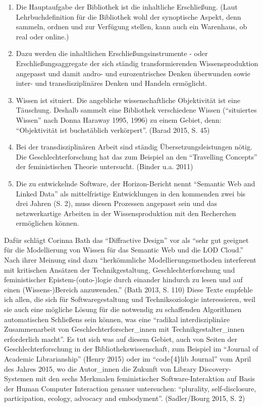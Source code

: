 \begin{enumerate}
\def\labelenumi{\arabic{enumi}.}
\item
  Die Hauptaufgabe der Bibliothek ist die inhaltliche Erschließung.
  (Laut Lehrbuchdefinition für die Bibliothek wohl der synoptische
  Aspekt, denn sammeln, ordnen und zur Verfügung stellen, kann auch ein
  Warenhaus, ob real oder online.)
\item
  Dazu werden die inhaltlichen Erschließungsinstrumente - oder
  Erschließungsaggregate der sich ständig transformierenden
  Wissensproduktion angepasst und damit andro- und eurozentrisches
  Denken überwunden sowie inter- und transdisziplinäres Denken und
  Handeln ermöglicht.
\item
  Wissen ist situiert. Die angebliche wissenschaftliche Objektivität ist
  eine Täuschung. Deshalb sammelt eine Bibliothek verschiedene Wissen
  (\enquote{situiertes Wissen} nach Donna Haraway 1995, 1996) zu einem
  Gebiet, denn: \enquote{Objektivität ist buchstäblich verkörpert}.
  (Barad 2015, S. 45)
\item
  Bei der transdisziplinären Arbeit sind ständig Übersetzungsleistungen
  nötig. Die Geschlechterforschung hat das zum Beispiel an den
  \enquote{Travelling Concepts} der feministischen Theorie untersucht.
  (Binder u.a. 2011)
\item
  Die zu entwickelnde Software, der Horizon-Bericht nennt
  \enquote{Semantic Web and Linked Data} als mittelfristige
  Entwicklungen in den kommenden zwei bis drei Jahren (S. 2), muss
  diesen Prozessen angepasst sein und das netzwerkartige Arbeiten in der
  Wissensproduktion mit den Recherchen ermöglichen können.
\end{enumerate}

Dafür schlägt Corinna Bath das \enquote{Diffractive Design} vor als
\enquote{sehr gut geeignet für die Modellierung von Wissen für das
Semantic Web und die LOD Cloud.} Nach ihrer Meinung sind dazu
\enquote{herkömmliche Modellierungsmethoden interferent mit kritischen
Ansätzen der Technikgestaltung, Geschlechterforschung und feministischer
Epistem-(onto-)logie durch einander hindurch zu lesen und auf einen
(Wissens-)Bereich anzuwenden.} (Bath 2013, S. 110) Diese Texte empfehle
ich allen, die sich für Softwaregestaltung und Techniksoziologie
interessieren, weil sie auch eine mögliche Lösung für die notwendig zu
schaffenden Algorithmen automatischen Schließens sein können, was eine
\enquote{radikal interdisziplinäre Zusammenarbeit von
Geschlechterforscher\_innen mit Technikgestalter\_innen erforderlich
macht}. Es tut sich was auf diesem Gebiet, auch von Seiten der
Geschlechterforschung in der Bibliothekswissenschaft, zum Beispiel im
\enquote{Journal of Academic Librarianship} (Henry 2015) oder im
\enquote{code\{4\}lib Journal} vom April des Jahres 2015, wo die
Autor\_innen die Zukunft von Library Discovery-Systemen mit den sechs
Merkmalen feministischer Software-Interaktion auf Basis der Human
Computer Interaction genauer untersuchen: \enquote{plurality,
self-disclosure, participation, ecology, advocacy and embodyment}.
(Sadler/Bourg 2015, S. 2)

